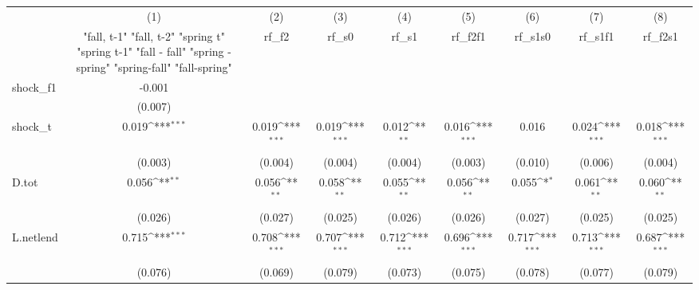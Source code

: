 {
\def\sym#1{\ifmmode^{#1}\else\(^{#1}\)\fi}
\begin{tabular}{l*{8}{c}}
\toprule
            &\multicolumn{1}{c}{(1)}&\multicolumn{1}{c}{(2)}&\multicolumn{1}{c}{(3)}&\multicolumn{1}{c}{(4)}&\multicolumn{1}{c}{(5)}&\multicolumn{1}{c}{(6)}&\multicolumn{1}{c}{(7)}&\multicolumn{1}{c}{(8)}\\
            &\multicolumn{1}{c}{  "fall, t-1" "fall, t-2" "spring t" "spring t-1"  "fall - fall" "spring - spring" "spring-fall" "fall-spring" }&\multicolumn{1}{c}{rf\_f2}&\multicolumn{1}{c}{rf\_s0}&\multicolumn{1}{c}{rf\_s1}&\multicolumn{1}{c}{rf\_f2f1}&\multicolumn{1}{c}{rf\_s1s0}&\multicolumn{1}{c}{rf\_s1f1}&\multicolumn{1}{c}{rf\_f2s1}\\
\midrule
shock\_f1    &      -0.001         &                     &                     &                     &                     &                     &                     &                     \\
            &     (0.007)         &                     &                     &                     &                     &                     &                     &                     \\
\addlinespace
shock\_t     &       0.019\sym{***}&       0.019\sym{***}&       0.019\sym{***}&       0.012\sym{**} &       0.016\sym{***}&       0.016         &       0.024\sym{***}&       0.018\sym{***}\\
            &     (0.003)         &     (0.004)         &     (0.004)         &     (0.004)         &     (0.003)         &     (0.010)         &     (0.006)         &     (0.004)         \\
\addlinespace
D.tot       &       0.056\sym{**} &       0.056\sym{**} &       0.058\sym{**} &       0.055\sym{**} &       0.056\sym{**} &       0.055\sym{*}  &       0.061\sym{**} &       0.060\sym{**} \\
            &     (0.026)         &     (0.027)         &     (0.025)         &     (0.026)         &     (0.026)         &     (0.027)         &     (0.025)         &     (0.025)         \\
\addlinespace
L.netlend   &       0.715\sym{***}&       0.708\sym{***}&       0.707\sym{***}&       0.712\sym{***}&       0.696\sym{***}&       0.717\sym{***}&       0.713\sym{***}&       0.687\sym{***}\\
            &     (0.076)         &     (0.069)         &     (0.079)         &     (0.073)         &     (0.075)         &     (0.078)         &     (0.077)         &     (0.079)         \\

\end{tabular}}
